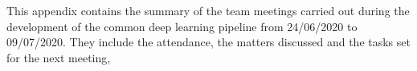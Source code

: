 This appendix contains the summary of the team meetings carried out during the development of the common deep learning pipeline from 24/06/2020 to 09/07/2020. They include the attendance, the matters discussed and the tasks set for the next meeting, 

\clearpage
